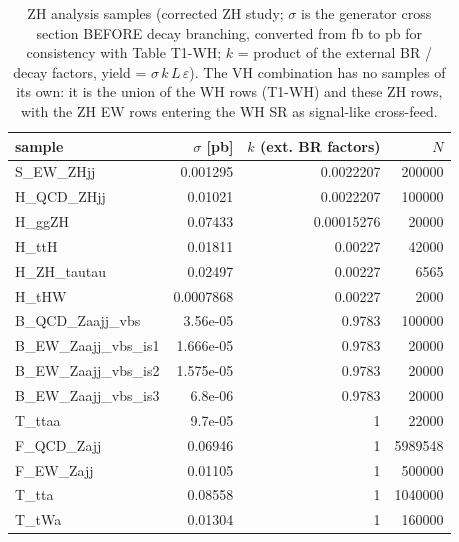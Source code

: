 \begin{table}[ht]\centering\small
\begin{tabular}{lrrr}\hline
sample & $\sigma$ [pb] & $k$ (ext. BR factors) & $N$ \\\hline
S\_EW\_ZHjj & 0.001295 & 0.0022207 & 200000 \\
H\_QCD\_ZHjj & 0.01021 & 0.0022207 & 100000 \\
H\_ggZH & 0.07433 & 0.00015276 & 20000 \\
H\_ttH & 0.01811 & 0.00227 & 42000 \\
H\_ZH\_tautau & 0.02497 & 0.00227 & 6565 \\
H\_tHW & 0.0007868 & 0.00227 & 2000 \\
B\_QCD\_Zaajj\_vbs & 3.56e-05 & 0.9783 & 100000 \\
B\_EW\_Zaajj\_vbs\_is1 & 1.666e-05 & 0.9783 & 20000 \\
B\_EW\_Zaajj\_vbs\_is2 & 1.575e-05 & 0.9783 & 20000 \\
B\_EW\_Zaajj\_vbs\_is3 & 6.8e-06 & 0.9783 & 20000 \\
T\_ttaa & 9.7e-05 & 1 & 22000 \\
F\_QCD\_Zajj & 0.06946 & 1 & 5989548 \\
F\_EW\_Zajj & 0.01105 & 1 & 500000 \\
T\_tta & 0.08558 & 1 & 1040000 \\
T\_tWa & 0.01304 & 1 & 160000 \\\hline
\end{tabular}
\caption{ZH analysis samples (corrected ZH study; $\sigma$ is the generator cross section BEFORE decay branching, converted from fb to pb for consistency with Table T1-WH; $k$ = product of the external BR / decay factors, yield = $\sigma\,k\,L\,\varepsilon$). The VH combination has no samples of its own: it is the union of the WH rows (T1-WH) and these ZH rows, with the ZH EW rows entering the WH SR as signal-like cross-feed.}
\end{table}

